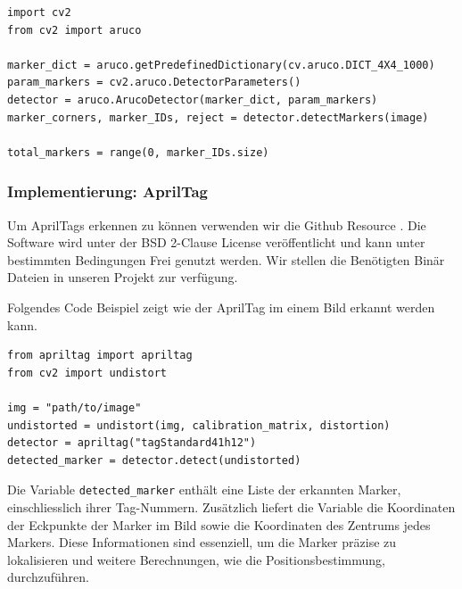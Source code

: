 
\begin{lstlisting}
import cv2
from cv2 import aruco

marker_dict = aruco.getPredefinedDictionary(cv.aruco.DICT_4X4_1000)
param_markers = cv2.aruco.DetectorParameters()
detector = aruco.ArucoDetector(marker_dict, param_markers)
marker_corners, marker_IDs, reject = detector.detectMarkers(image)

total_markers = range(0, marker_IDs.size)
\end{lstlisting}


\subsubsection{Implementierung: AprilTag}
Um AprilTags erkennen zu können verwenden wir die Github Resource \cite{apriltag_github}.
Die Software wird unter der BSD 2-Clause License veröffentlicht und kann unter bestimmten Bedingungen
Frei genutzt werden. Wir stellen die Benötigten Binär Dateien in unseren Projekt zur verfügung.

Folgendes Code Beispiel zeigt wie der AprilTag im einem Bild erkannt werden kann.


\begin{lstlisting}
from apriltag import apriltag
from cv2 import undistort

img = "path/to/image"
undistorted = undistort(img, calibration_matrix, distortion)
detector = apriltag("tagStandard41h12")
detected_marker = detector.detect(undistorted)
\end{lstlisting}


Die Variable \texttt{detected\_marker} enthält eine Liste der erkannten Marker, einschliesslich ihrer Tag-Nummern.
Zusätzlich liefert die Variable die Koordinaten der Eckpunkte der Marker im Bild sowie 
die Koordinaten des Zentrums jedes Markers. Diese Informationen sind essenziell, um die Marker 
präzise zu lokalisieren und weitere Berechnungen, wie die Positionsbestimmung, durchzuführen.


